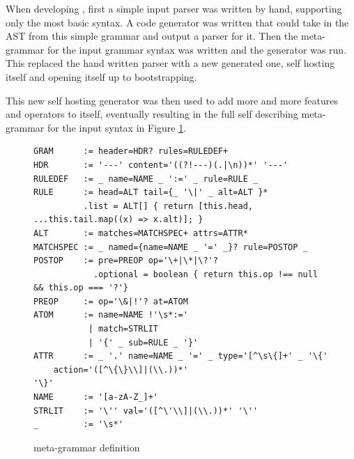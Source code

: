 When developing \tsPEG{}, first a simple input parser was written by hand, supporting only the most basic syntax. A code generator was written that could take in the AST from this simple grammar and output a parser for it. Then the meta-grammar for the input grammar syntax was written and the generator was run. This replaced the hand written parser with a new generated one, self hosting itself and opening itself up to bootstrapping.

This new self hosting generator was then used to add more and more features and operators to itself, eventually resulting in the full self describing meta-grammar for the \tsPEG{} input syntax in Figure \ref{tspegsyntax}.

\begin{figure}
    \caption{\tsPEG{} meta-grammar definition}
    \label{tspegsyntax}
    \begin{lstlisting}
GRAM      := header=HDR? rules=RULEDEF+
HDR       := '---' content='((?!---)(.|\n))*' '---'
RULEDEF   := _ name=NAME _ ':=' _ rule=RULE _
RULE      := head=ALT tail={_ '\|' _ alt=ALT }*
          .list = ALT[] { return [this.head, ...this.tail.map((x) => x.alt)]; }
ALT       := matches=MATCHSPEC+ attrs=ATTR*
MATCHSPEC := _ named={name=NAME _ '=' _}? rule=POSTOP _
POSTOP    := pre=PREOP op='\+|\*|\?'?
            .optional = boolean { return this.op !== null && this.op === '?'}
PREOP     := op='\&|!'? at=ATOM
ATOM      := name=NAME !'\s*:='
           | match=STRLIT
           | '{' _ sub=RULE _ '}'
ATTR      := _ '.' name=NAME _ '=' _ type='[^\s\{]+' _ '\{'
    action='([^\{\}\\]|(\\.))*'
'\}'
NAME      := '[a-zA-Z_]+'
STRLIT    := '\'' val='([^\'\\]|(\\.))*' '\''
_         := '\s*'
    \end{lstlisting}
\end{figure}
